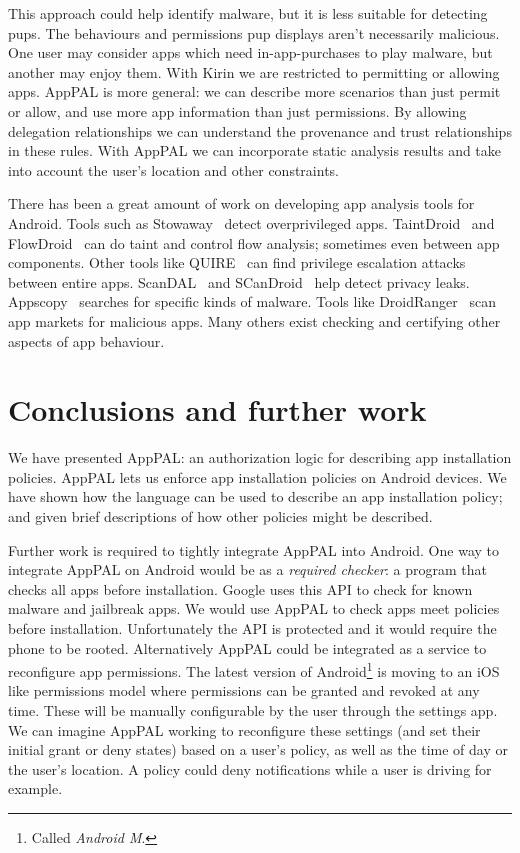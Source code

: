 \documentclass[]{llncs}
\begin{document}
This approach could help identify malware, but it is less suitable for detecting \acp{pup}.
The behaviours and permissions \ac{pup} displays aren't necessarily malicious.
One user may consider apps which need in-app-purchases to play malware, but another may enjoy them.
With Kirin we are restricted to permitting or allowing apps.
AppPAL is more general: we can describe more scenarios than just permit or allow, and use more app information than just permissions.
By allowing delegation relationships we can understand the provenance and trust relationships in these rules.
With AppPAL we can incorporate static analysis results and take into account the user's location and other constraints.

There has been a great amount of work on developing app analysis tools for Android.
Tools such as Stowaway~\cite{Felt:2011kj} detect overprivileged apps.
TaintDroid~\cite{Enck:2010uw} and FlowDroid~\cite{Fritz:2013vi} can do taint and control flow analysis; sometimes even between app components.
Other tools like QUIRE~\cite{Bugiel:2012ui} can find privilege escalation attacks between entire apps.
ScanDAL~\cite{Kim:2012vt} and SCanDroid~\cite{Fuchs:2009vi} help detect privacy leaks.
Appscopy~\cite{Feng:kPGZr_ja} searches for specific kinds of malware.
Tools like DroidRanger~\cite{Zhou:2012tb} scan app markets for malicious apps.
Many others exist checking and certifying other aspects of app behaviour.

\section{Conclusions and further work}

We have presented AppPAL: an authorization logic for describing app installation policies.
AppPAL lets us enforce app installation policies on Android devices.
We have shown how the language can be used to describe an app installation policy;
  and given brief descriptions of how other policies might be described.

Further work is required to tightly integrate AppPAL into Android.
One way to integrate AppPAL on Android would be as a \emph{required checker}: a program that checks all apps before installation.
Google uses this API to check for known malware and jailbreak apps.
We would use AppPAL to check apps meet policies before installation.
Unfortunately the API is protected and it would require the phone to be rooted.
Alternatively AppPAL could be integrated as a service to reconfigure app permissions.
The latest version of Android\footnote{Called \emph{Android M}.} is moving to an iOS like permissions model where permissions can be granted and revoked at any time.
These will be manually configurable by the user through the settings app.
We can imagine AppPAL working to reconfigure these settings (and set their initial grant or deny states) based on a user's policy, as well as the time of day or the user's location.
A policy could deny notifications while a user is driving for example.
\end{document}

